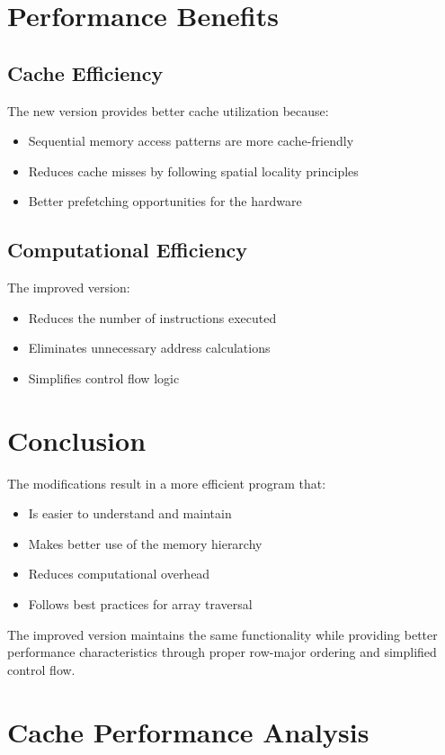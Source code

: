 \documentclass{article}
\begin{document}
\section{Performance Benefits}

\subsection{Cache Efficiency}
The new version provides better cache utilization because:
\begin{itemize}
    \item Sequential memory access patterns are more cache-friendly
    \item Reduces cache misses by following spatial locality principles
    \item Better prefetching opportunities for the hardware
\end{itemize}

\subsection{Computational Efficiency}
The improved version:
\begin{itemize}
    \item Reduces the number of instructions executed
    \item Eliminates unnecessary address calculations
    \item Simplifies control flow logic
\end{itemize}

\section{Conclusion}
The modifications result in a more efficient program that:
\begin{itemize}
    \item Is easier to understand and maintain
    \item Makes better use of the memory hierarchy
    \item Reduces computational overhead
    \item Follows best practices for array traversal
\end{itemize}

The improved version maintains the same functionality while providing better performance characteristics through proper row-major ordering and simplified control flow.

\section{Cache Performance Analysis}
\end{document}
